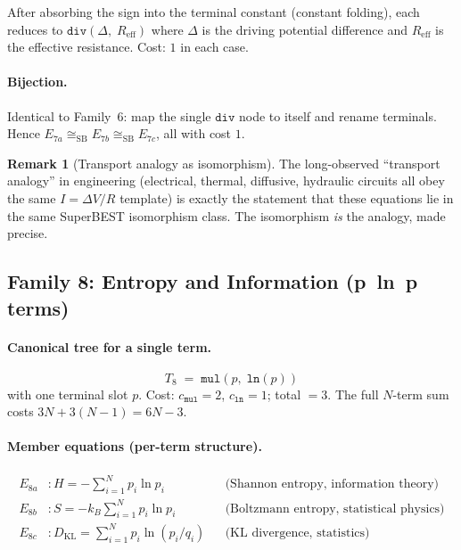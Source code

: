 \documentclass[12pt,a4paper]{article}
\theoremstyle{definition}
\newtheorem{remark}[theorem]{Remark}
\newcommand{\mmul}{\mathtt{mul}}
\newcommand{\mdiv}{\mathtt{div}}
\newcommand{\mln}{\mathtt{ln}}
\newcommand{\siso}{\cong_{\mathrm{SB}}}
\begin{document}
After absorbing the sign into the terminal constant (constant folding),
each reduces to $\mdiv(\Delta,\; R_{\mathrm{eff}})$ where $\Delta$ is the
driving potential difference and $R_{\mathrm{eff}}$ is the effective resistance.
Cost: $1$ in each case.

\paragraph{Bijection.}
Identical to Family~6: map the single $\mdiv$ node to itself and rename
terminals.  Hence $E_{7a} \siso E_{7b} \siso E_{7c}$, all with cost $1$.

\begin{remark}[Transport analogy as isomorphism]
The long-observed ``transport analogy'' in engineering (electrical, thermal,
diffusive, hydraulic circuits all obey the same $I = \Delta V / R$ template)
is exactly the statement that these equations lie in the same SuperBEST
isomorphism class.  The isomorphism \emph{is} the analogy, made precise.
\end{remark}

\subsection{Family 8: Entropy and Information (p~ln~p terms)}
\label{sec:fam8}

\paragraph{Canonical tree for a single term.}
\[
  T_8 \;=\; \mmul(p,\; \mln(p))
\]
with one terminal slot $p$.  Cost: $c_{\mmul} = 2$, $c_{\mln} = 1$; total $= 3$.
The full $N$-term sum costs $3N + 3(N-1) = 6N - 3$.

\paragraph{Member equations (per-term structure).}
\begin{align*}
  E_{8a} &: H = -\sum_{i=1}^{N} p_i \ln p_i
            && \text{(Shannon entropy, information theory)} \\
  E_{8b} &: S = -k_B \sum_{i=1}^{N} p_i \ln p_i
            && \text{(Boltzmann entropy, statistical physics)} \\
  E_{8c} &: D_{\mathrm{KL}} = \sum_{i=1}^{N} p_i \ln(p_i/q_i)
            && \text{(KL divergence, statistics)}
\end{align*}
\end{document}

